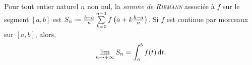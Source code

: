 \begin{theo}
    \cite{acamanes} \\
    Pour tout entier naturel $n$ non nul, la \emph{somme de \textsc{Riemann}} associée à $f$ sur le segment $[a, b]$ est $S_n \defeq \frac{b-a}{n} \sum\limits_{k=0}^{n-1} f \left( a + k \frac{b-a}{n} \right)$. Si $f$ est continue par morceaux sur $[a, b]$, alors, 
    $$\lim_{n \to + \infty} S_n = \int_a^b f(t) \, \mathrm{d} t.$$
\end{theo}

\begin{marginfigure}[-3cm]
    
\end{marginfigure}

